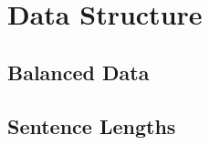 \section{Data Structure}
\label{sec:data_structure}

  \subsection{Balanced Data}
  \label{sec:balanced_data}

  \subsection{Sentence Lengths}
  \label{sec:sentence_lengths}
